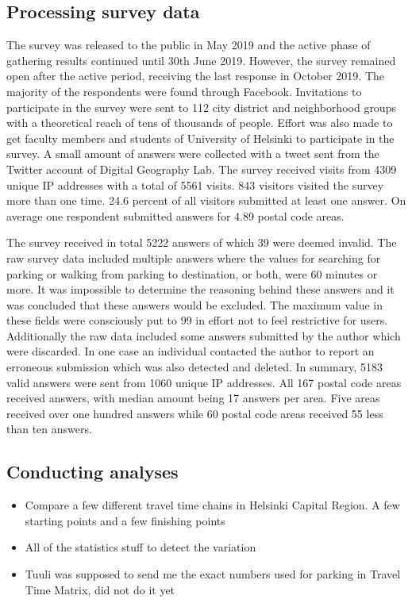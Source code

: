 \subsection{Processing survey data}
\justify
The survey was released to the public in May 2019 and the active phase of gathering results continued until 30th June 2019. However, the survey remained open after the active period, receiving the last response in October 2019. The majority of the respondents were found through Facebook. Invitations to participate in the survey were sent to 112 city district and neighborhood groups with a theoretical reach of tens of thousands of people. Effort was also made to get faculty members and students of University of Helsinki to participate in the survey. A small amount of answers were collected with a tweet sent from the Twitter account of Digital Geography Lab. The survey received visits from 4309 unique IP addresses with a total of 5561 visits. 843 visitors visited the survey more than one time. 24.6 percent of all visitors submitted at least one answer. On average one respondent submitted answers for 4.89 postal code areas.

The survey received in total 5222 answers of which 39 were deemed invalid. The raw survey data included multiple answers where the values for searching for parking or walking from parking to destination, or both, were 60 minutes or more. It was impossible to determine the reasoning behind these answers and it was concluded that these answers would be excluded. The maximum value in these fields were consciously put to 99 in effort not to feel restrictive for users. Additionally the raw data included some answers submitted by the author which were discarded. In one case an individual contacted the author to report an erroneous submission which was also detected and deleted. In summary, 5183 valid answers were sent from 1060 unique IP addresses. All 167 postal code areas received answers, with median amount being 17 answers per area. Five areas received over one hundred answers while 60 postal code areas received 55 less than ten answers.

\subsection{Conducting analyses}
\justify
\begin{itemize}
  \item Compare a few different travel time chains in Helsinki Capital Region. A few starting points and a few finishing points
  \item All of the statistics stuff to detect the variation 
  \item Tuuli was supposed to send me the exact numbers used for parking in Travel Time Matrix, did not do it yet
\end{itemize}